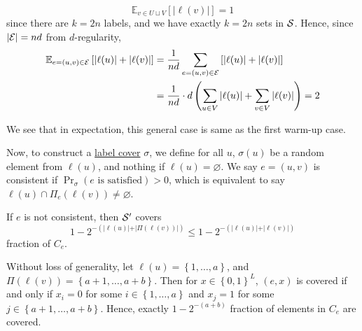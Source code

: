 \begin{enumerate}[(a)]
	      \[
		      \mathbb{E}_{v\in U \sqcup V}\left[ \vert \ell (v) \vert \right] = 1
	      \]
	      since there are \(k=2n\) labels, and we have exactly \(k=2n\) sets in \(\mathcal{\MakeUppercase{s}} \). Hence, since \(\vert \mathcal{\MakeUppercase{e}}  \vert = nd \) from \(d\)-regularity,
	      \[
		      \begin{split}
			      \mathbb{E}_{e=(u, v)\in \mathcal{\MakeUppercase{e}} }\left[ \vert \ell (u) \vert + \vert \ell (v) \vert \right]
			      &= \frac{1}{nd} \sum_{e=(u, v)\in \mathcal{\MakeUppercase{e}} } \left[ \vert \ell (u) \vert + \vert \ell (v) \vert  \right]\\
			      &= \frac{1}{nd}\cdot d \left( \sum_{u\in V} \vert \ell (u) \vert + \sum_{v\in V} \vert \ell (v) \vert \right)
			      = 2
		      \end{split}
	      \]
	      \begin{intuition}
		      We see that in expectation, this general case is same as the first warm-up case.
	      \end{intuition}
	      Now, to construct a \hyperref[prb:label-cover]{label cover} \(\sigma \), we define for all \(u\), \(\sigma (u)\) be a random element from \(\ell (u)\), and nothing if \(\ell (u) = \varnothing \). We say \(e=(u, v)\) is consistent if \(\Pr_{\sigma }(e \text{ is satisfied} ) > 0\), which is equivalent to say \(\ell (u) \cap \Pi _e(\ell (v)) \neq \varnothing \).
	      \begin{claim}
		      If \(e\) is not consistent, then \(\mathcal{\MakeUppercase{S}} ^\prime \) covers
		      \[
			      1 - 2^{- (\vert \ell (u) \vert + \vert \Pi (\ell (v)) \vert )} \leq 1 - 2^{- (\vert \ell (u) \vert + \vert \ell (v) \vert )}
		      \]
		      fraction of \(C_e\).
	      \end{claim}
	      \begin{explanation}
		      Without loss of generality, let \(\ell (u) = \left\{ 1, \ldots , a  \right\} \), and \(\Pi (\ell (v)) = \left\{ a+1, \ldots , a+b \right\} \). Then for \(x\in \left\{ 0, 1 \right\} ^L\), \((e, x)\) is covered if and only if \(x_i = 0\) for some \(i\in \left\{ 1, \ldots , a  \right\} \) and \(x_j = 1\) for some \(j\in \left\{ a+1, \ldots , a+b  \right\} \). Hence, exactly \(1-2^{-(a+b)}\) fraction of elements in \(C_e\) are covered.
	      \end{explanation}


\end{enumerate}
